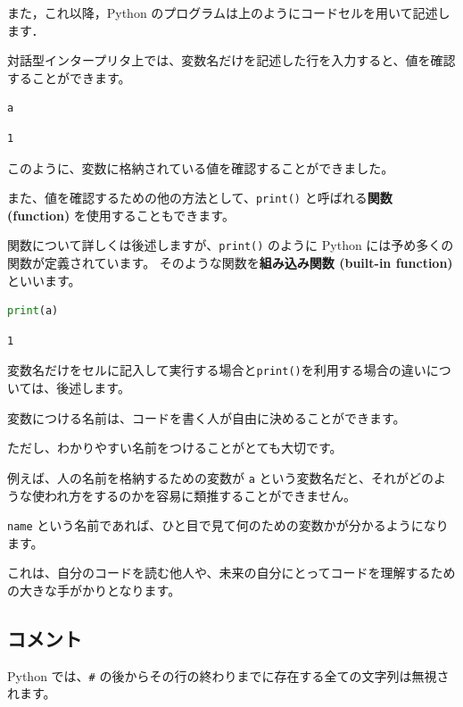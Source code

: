 また，これ以降，Python のプログラムは上のようにコードセルを用いて記述します．


対話型インタープリタ上では、変数名だけを記述した行を入力すると、値を確認することができます。


\begin{lstlisting}[style=codecell,language=Python]
a
\end{lstlisting}

\begin{lstlisting}[style=outputcell]
1
\end{lstlisting}

このように、変数に格納されている値を確認することができました。

また、値を確認するための他の方法として、\texttt{print()} と呼ばれる\textbf{関数 (function)} を使用することもできます。

関数について詳しくは後述しますが、\texttt{print()} のように Python には予め多くの関数が定義されています。 そのような関数を\textbf{組み込み関数 (built-in function)} といいます。


\begin{lstlisting}[style=codecell,language=Python]
print(a)
\end{lstlisting}

\begin{lstlisting}[style=outputcell]
1
\end{lstlisting}

変数名だけをセルに記入して実行する場合と\texttt{print()}を利用する場合の違いについては、後述します。


変数につける名前は、コードを書く人が自由に決めることができます。

ただし、わかりやすい名前をつけることがとても大切です。

例えば、人の名前を格納するための変数が \texttt{a} という変数名だと、それがどのような使われ方をするのかを容易に類推することができません。

\texttt{name} という名前であれば、ひと目で見て何のための変数かが分かるようになります。

これは、自分のコードを読む他人や、未来の自分にとってコードを理解するための大きな手がかりとなります。


\subsection{コメント}


Python では、\texttt{\#} の後からその行の終わりまでに存在する全ての文字列は無視されます。

